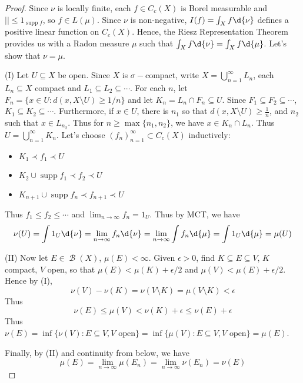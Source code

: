 \documentclass[11pt, a4paper]{memoir}
\theoremstyle{change}
\theoremstyle{plain}
\theoremstyle{nonumberplain}
\newtheorem{proof}{Proof}
\DeclareMathOperator{\B}{{\mathcal{B}}}
\DeclareMathOperator{\supp}{supp}
\begin{document}
\begin{proof}
    Since $\nu$ is locally finite, each $f\in C_c(X)$ is Borel measurable and $||\leq 1_{\supp f}$, so $f\in L(\mu)$.
    Since $\nu$ is non-negative, $I(f)=\int_X f\d{\nu}$ defines a positive linear function on $C_c(X)$.
    Hence, the Riesz Representation Theorem provides us with a Radon measure $\mu$ such that $\int_X f\d{\nu}=\int_X f\d{\mu}$.
    Let's show that $\nu=\mu$.

    (I) Let $U\subseteq X$ be open.
    Since $X$ is $\sigma-$compact, write $X=\bigcup_{n=1}^\infty L_n$, each $L_n\subseteq X$ compact and $L_1\subseteq L_2\subseteq\cdots$.
    For each $n$, let $F_n=\{x\in U: d(x,X\setminus U)\geq1/n\}$ and let $K_n=L_n\cap F_n\subseteq U$.
    Since $F_1\subseteq F_2\subseteq\cdots$, $K_1\subseteq K_2\subseteq\cdots$.
    Furthermore, if $x\in U$, there is $n_1$ so that $d(x,X\setminus U)\geq \frac{1}{n}$, and $n_2$ such that $x\in L_{n_2}$.
    Thus for $n\geq\max\{n_1,n_2\}$, we have $x\in K_n\cap L_n$.
    Thus $U=\bigcup_{n=1}^\infty K_n$.
    Let's choose $(f_n)_{n=1}^\infty\subset C_c(X)$ inductively:
    \begin{itemize}[nl]
        \item $K_1\prec f_1\prec U$
        \item $K_2\cup \supp f_1\prec f_2\prec U$
        \item $K_{n+1}\cup\supp f_n\prec f_{n+1}\prec U$
    \end{itemize}
    Thus $f_1\leq f_2\leq\cdots$ and $\lim_{n\to\infty}f_n=1_U$.
    Thus by MCT, we have
    \begin{equation*}
        \nu(U)=\int 1_U\d{\nu}=\lim_{n\to\infty}f_n\d{\nu}=\lim_{n\to\infty}\int f_n\d{\mu}=\int 1_U\d{\mu}=\mu(U)
    \end{equation*}

    (II) Now let $E\in\B(X)$, $\mu(E)<\infty$.
    Given $\epsilon>0$, find $K\subseteq E\subseteq V$, $K$ compact, $V$ open, so that $\mu(E)<\mu(K)+\epsilon/2$ and $\mu(V)<\mu(E)+\epsilon/2$.
    Hence by (I),
    \begin{equation*}
        \nu(V)-\nu(K) = \nu(V\setminus K) =\mu(V\setminus K)<\epsilon
    \end{equation*}
    Thus
    \begin{equation*}
        \nu(E)\leq\mu(V)<\nu(K)+\epsilon\leq\nu(E)+\epsilon
    \end{equation*}
    Thus $\nu(E)=\inf\{\nu(V):E\subseteq V,V\text{ open}\}=\inf\{\mu(V):E\subseteq V,V\text{ open}\}=\mu(E)$.

    Finally, by (II) and continuity from below, we have
    \begin{equation*}
        \mu(E)=\lim_{n\to\infty}\mu(E_n)=\lim_{n\to\infty}\nu(E_n)=\nu(E)
    \end{equation*}
\end{proof}
\end{document}
